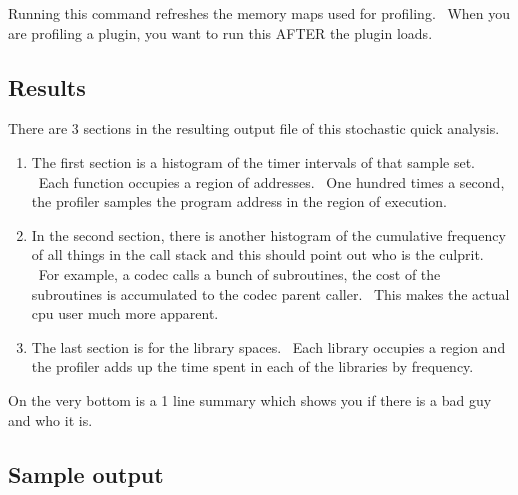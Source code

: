 Running this command refreshes the memory maps used for profiling. \ When you are profiling a plugin, you want to run this AFTER the plugin loads.
\medskip

\subsection{Results}

There are 3 sections in the resulting output file of this stochastic quick analysis.
\medskip

\begin{enumerate}[nosep]
	\item The first section is a histogram of the timer intervals of that sample set. \ Each function occupies a region of addresses. \ One hundred times a second, the profiler samples the program address in the region of execution.
	\item In the second section, there is another histogram of the cumulative frequency of all things in the call stack and this should point out who is the culprit. \ For example, a codec calls a bunch of subroutines, the cost of the subroutines is accumulated to the codec parent caller. \ This makes the actual cpu user much more apparent.
	\item The last section is for the library spaces. \ Each library occupies a region and the profiler adds up the time spent in each of the libraries by frequency.
\end{enumerate}
\smallskip

On the very bottom is a 1 line summary which shows you if there is a bad guy and who it is.
\medskip

\subsection{Sample output}

\medskip


